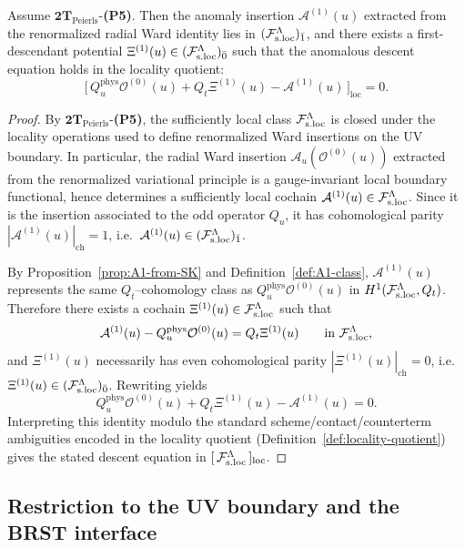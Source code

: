 \begin{lemma}
\label{lem:A1-and-J-local}
Assume $\mathbf{2T}_{\mathrm{Peierls}}$-\textbf{(P5)}.  Then the anomaly insertion
$\mathcal A^{(1)}(u)$ extracted from the renormalized radial Ward identity lies in
$(\mathcal F_{\mathrm{s.loc}}^\Lambda)_{\bar 1}$, and there exists a first-descendant potential
\(\Xi^{(1)}(u)\in(\mathcal F_{\mathrm{s.loc}}^\Lambda)_{\bar 0}\) such that the anomalous descent equation holds in the locality quotient:
\[
\big[\,Q_u^{\mathrm{phys}}\mathcal O^{(0)}(u)+Q_t\Xi^{(1)}(u)-\mathcal A^{(1)}(u)\,\big]_{\mathrm{loc}}=0.
\]
\end{lemma}

\begin{proof}
By $\mathbf{2T}_{\mathrm{Peierls}}$-\textbf{(P5)}, the sufficiently local class
$\mathcal F_{\mathrm{s.loc}}^\Lambda$ is closed under the locality operations used to define renormalized Ward
insertions on the UV boundary.  In particular, the radial Ward insertion
$\mathcal A_u(\mathcal O^{(0)}(u))$ extracted from the renormalized variational
principle is a gauge-invariant local boundary functional, hence determines a
sufficiently local cochain $\mathcal A^{(1)}(u)\in\mathcal F_{\mathrm{s.loc}}^\Lambda$.  Since it is the
insertion associated to the odd operator $Q_u$, it has cohomological parity
$|\mathcal A^{(1)}(u)|_{\mathrm{ch}}=1$, i.e.\ $\mathcal A^{(1)}(u)\in(\mathcal F_{\mathrm{s.loc}}^\Lambda)_{\bar 1}$.

By Proposition~\ref{prop:A1-from-SK} and Definition~\ref{def:A1-class},
$\mathcal A^{(1)}(u)$ represents the same $Q_t$--cohomology class as
$Q_u^{\mathrm{phys}}\mathcal O^{(0)}(u)$ in $H^1(\mathcal F_{\mathrm{s.loc}}^\Lambda,Q_t)$.  Therefore there
exists a cochain \(\Xi^{(1)}(u)\in\mathcal F_{\mathrm{s.loc}}^\Lambda\) such that
\[
\mathcal A^{(1)}(u)-Q_u^{\mathrm{phys}}\mathcal O^{(0)}(u)=Q_t\Xi^{(1)}(u)
\qquad\text{in }\mathcal F_{\mathrm{s.loc}}^\Lambda,
\]
and \(\Xi^{(1)}(u)\) necessarily has even cohomological parity
\(|\Xi^{(1)}(u)|_{\mathrm{ch}}=0\), i.e.\ \(\Xi^{(1)}(u)\in(\mathcal F_{\mathrm{s.loc}}^\Lambda)_{\bar 0}\).
Rewriting yields
\[
Q_u^{\mathrm{phys}}\mathcal O^{(0)}(u)+Q_t\Xi^{(1)}(u)-\mathcal A^{(1)}(u)=0.
\]
Interpreting this identity modulo the standard scheme/contact/counterterm
ambiguities encoded in the locality quotient (Definition~\ref{def:locality-quotient})
gives the stated descent equation in $[\,\mathcal F_{\mathrm{s.loc}}^\Lambda\,]_{\mathrm{loc}}$.
\end{proof}

\subsection{Restriction to the UV boundary and the BRST interface}
\label{subsec:restriction-boundary}

